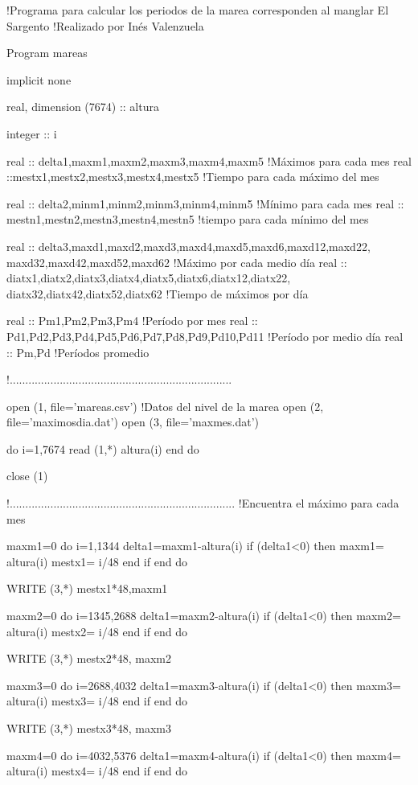 !Programa para calcular los periodos de la marea corresponden
al manglar El Sargento
!Realizado por Inés Valenzuela

Program mareas

implicit none

 
real, dimension (7674) :: altura

integer :: i


  
real :: delta1,maxm1,maxm2,maxm3,maxm4,maxm5 !Máximos para cada mes
real ::mestx1,mestx2,mestx3,mestx4,mestx5 !Tiempo para cada máximo del mes

real :: delta2,minm1,minm2,minm3,minm4,minm5 !Mínimo para cada mes
real :: mestn1,mestn2,mestn3,mestn4,mestn5 !tiempo para cada mínimo del mes

real :: delta3,maxd1,maxd2,maxd3,maxd4,maxd5,maxd6,maxd12,maxd22,
maxd32,maxd42,maxd52,maxd62 !Máximo por cada medio día
real :: diatx1,diatx2,diatx3,diatx4,diatx5,diatx6,diatx12,diatx22,
diatx32,diatx42,diatx52,diatx62 !Tiempo de máximos por día

real :: Pm1,Pm2,Pm3,Pm4 !Período por mes
real :: Pd1,Pd2,Pd3,Pd4,Pd5,Pd6,Pd7,Pd8,Pd9,Pd10,Pd11 !Período por medio día
real :: Pm,Pd !Períodos promedio

!.......................................................................

open (1, file='mareas.csv') !Datos del nivel de la marea
open (2, file='maximosdia.dat')
open (3, file='maxmes.dat')

do i=1,7674
read (1,*) altura(i)
end do

close (1)

!........................................................................
!Encuentra el máximo para cada mes

maxm1=0
do i=1,1344
delta1=maxm1-altura(i)
if (delta1<0) then
maxm1= altura(i)
mestx1= i/48
end if
end do

WRITE (3,*) mestx1*48,maxm1

maxm2=0
do i=1345,2688
delta1=maxm2-altura(i)
if (delta1<0) then
maxm2= altura(i)
mestx2= i/48
end if
end do

WRITE (3,*) mestx2*48, maxm2 

maxm3=0
do i=2688,4032
delta1=maxm3-altura(i)
if (delta1<0) then
maxm3= altura(i)
mestx3= i/48
end if
end do

WRITE (3,*) mestx3*48, maxm3


maxm4=0
do i=4032,5376
delta1=maxm4-altura(i)
if (delta1<0) then
maxm4= altura(i)
mestx4= i/48
end if
end do

